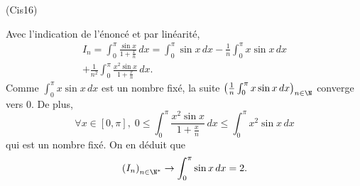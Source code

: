 \begin{tiny}(Cis16)\end{tiny} Avec l'indication de l'énoncé et par linéarité,
\begin{multline*}
 I_n = 
\int_{0}^{\pi}\frac{ \sin x}{ 1 + \frac{x}{n}}\, dx
= \int_{0}^{\pi}\sin x\, dx -\frac{1}{n}\int_{0}^{\pi}x\sin x\, dx\\
+ \frac{1}{n^2} \int_{0}^{\pi} \frac{x^2 \sin x}{1 + \frac{x}{n}}\, dx.
\end{multline*}
Comme $\int_0^\pi x\sin x\,dx$ est un nombre fixé, la suite $\left(\frac{1}{n} \int_0^\pi x\sin x\,dx\right)_{n\in \N}$ converge vers $0$. De plus,
\[
\forall x\in [0,\pi], \; 0 \leq \int_{0}^{\pi} \frac{x^2 \sin x}{1 + \frac{x}{n}}\, dx 
\leq \int_{0}^{\pi} x^2 \sin x\, dx 
\]
qui est un nombre fixé. On en déduit que
\[
 \left( I_n \right)_{n \in \N^*} \rightarrow \int_{0}^{\pi}\sin x\, dx = 2.
\]
